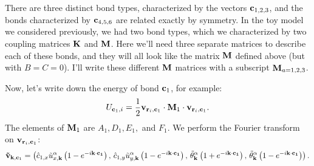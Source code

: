 \documentclass[12pt]{article}
\begin{document}
There are three distinct bond types, characterized by the vectors $\mathbf{c}_{1,2,3}$, and the bonds characterized by $\mathbf{c}_{4,5,6}$ are related exactly by symmetry. In the toy model we considered previously, we had two bond types, which we characterized by two coupling matrices $\mathbf{K}$ and $\mathbf{M}$. Here we'll need three separate matrices to describe each of these bonds, and they will all look like the matrix $\mathbf{M}$ defined above (but with $B=C=0$). I'll write these different $\mathbf{M}$ matrices with a subscript $\mathbf{M}_{a=1,2,3}$.

Now, let's write down the energy of bond $\mathbf{c}_1$, for example:
\[ U_{\mathbf{c}_1,i} = \frac{1}{2} \mathbf{v}_{\mathbf{r}_i, \mathbf{c}_1} \cdot \mathbf{M}_1 \cdot \mathbf{v}_{\mathbf{r}_i,\mathbf{c}_1}.\]
The elements of $\mathbf{M}_1$ are $A_1,D_1,E_1,$ and $F_1$. We perform the Fourier transform on $\mathbf{v}_{\mathbf{r}_i,\mathbf{c}_1}$:
\[ \mathbf{\tilde v}_{\mathbf{k},\mathbf{c}_1} = \left( \hat c_{1,x}\tilde u_{x,\mathbf{k}}^\alpha 
\left(1-e^{-i\mathbf{k}\cdot\mathbf{c_1}}\right), \, \hat c_{1,y}\tilde u_{y,\mathbf{k}}^\alpha\left(1-e^{-i\mathbf{k}\cdot\mathbf{c_1}}\right), \, \tilde {\theta}_{\mathbf{k}}^\alpha 
\left(1+e^{-i\mathbf{k}\cdot\mathbf{c_1} } \right), \, \tilde {\theta}_{\mathbf{k}}^\alpha 
\left(1-e^{-i\mathbf{k}\cdot\mathbf{c_1} } \right)   \right).\]
\end{document}
